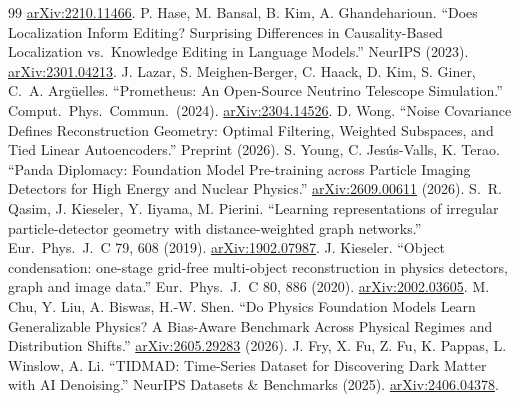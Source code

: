 \documentclass[10pt,twocolumn]{extarticle}
\begin{document}
\begin{thebibliography}{99}
\href{https://arxiv.org/abs/2210.11466}{arXiv:2210.11466}.
 P. Hase, M. Bansal, B. Kim, A. Ghandeharioun. ``Does
Localization Inform Editing? Surprising Differences in Causality-Based
Localization vs.\ Knowledge Editing in Language Models.'' NeurIPS (2023).
\href{https://arxiv.org/abs/2301.04213}{arXiv:2301.04213}.
 J. Lazar, S. Meighen-Berger, C. Haack, D. Kim,
S. Giner, C.~A. Arg\"uelles. ``Prometheus: An Open-Source Neutrino Telescope
Simulation.'' Comput.\ Phys.\ Commun.\ (2024).
\href{https://arxiv.org/abs/2304.14526}{arXiv:2304.14526}.
 D. Wong. ``Noise Covariance Defines Reconstruction
Geometry: Optimal Filtering, Weighted Subspaces, and Tied Linear
Autoencoders.'' Preprint (2026).
 S. Young, C. Jes\'us-Valls, K. Terao. ``Panda Diplomacy:
Foundation Model Pre-training across Particle Imaging Detectors for High
Energy and Nuclear Physics.''
\href{https://arxiv.org/abs/2609.00611}{arXiv:2609.00611} (2026).
 S.~R. Qasim, J. Kieseler, Y. Iiyama, M. Pierini.
``Learning representations of irregular particle-detector geometry with
distance-weighted graph networks.'' Eur.\ Phys.\ J.\ C 79, 608 (2019).
\href{https://arxiv.org/abs/1902.07987}{arXiv:1902.07987}.
 J. Kieseler. ``Object condensation: one-stage grid-free
multi-object reconstruction in physics detectors, graph and image data.''
Eur.\ Phys.\ J.\ C 80, 886 (2020).
\href{https://arxiv.org/abs/2002.03605}{arXiv:2002.03605}.
 M. Chu, Y. Liu, A. Biswas, H.-W. Shen. ``Do Physics Foundation Models Learn Generalizable Physics?
A Bias-Aware Benchmark Across Physical Regimes and Distribution Shifts.''
\href{https://arxiv.org/abs/2605.29283}{arXiv:2605.29283} (2026).
 J. Fry, X. Fu, Z. Fu, K. Pappas, L. Winslow, A. Li.
``TIDMAD: Time-Series Dataset for Discovering Dark Matter with AI Denoising.''
NeurIPS Datasets \& Benchmarks (2025).
\href{https://arxiv.org/abs/2406.04378}{arXiv:2406.04378}.
\end{thebibliography}
\end{document}
